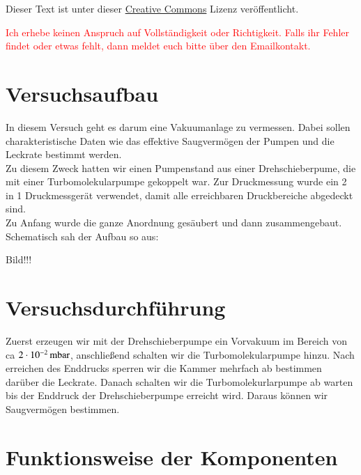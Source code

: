 




\maketitle

Dieser Text ist unter dieser \href{http://creativecommons.org/licenses/by-nc-sa/4.0/}{Creative Commons} Lizenz veröffentlicht.

\textcolor{red}{Ich erhebe keinen Anspruch auf Vollständigkeit oder Richtigkeit. Falls ihr Fehler findet oder etwas fehlt, dann meldet euch bitte über den Emailkontakt.}

\tableofcontents


\newpage


\section{Versuchsaufbau}

In diesem Versuch geht es darum eine Vakuumanlage zu vermessen. Dabei sollen charakteristische Daten wie das effektive Saugvermögen der Pumpen und die Leckrate bestimmt werden. \\
Zu diesem Zweck hatten wir einen Pumpenstand aus einer Drehschieberpume, die mit einer Turbomolekularpumpe gekoppelt war. Zur Druckmessung wurde ein 2 in 1 Druckmessgerät verwendet, damit alle erreichbaren Druckbereiche abgedeckt sind. \\
Zu Anfang wurde die ganze Anordnung gesäubert und dann zusammengebaut. Schematisch sah der Aufbau so aus:


Bild!!!


\section{Versuchsdurchführung}

Zuerst erzeugen wir mit der Drehschieberpumpe ein Vorvakuum im Bereich von ca $\unit[2 \cdot 10^{-2}]{mbar}$, anschließend schalten wir die Turbomolekularpumpe hinzu. Nach erreichen des Enddrucks sperren wir die Kammer mehrfach ab bestimmen darüber die Leckrate. Danach schalten wir die Turbomolekurlarpumpe ab warten bis der Enddruck der Drehschieberpumpe erreicht wird. Daraus können wir Saugvermögen bestimmen.


\section{Funktionsweise der Komponenten}


